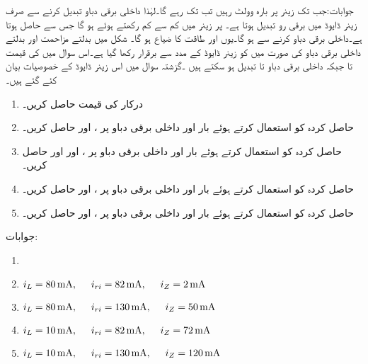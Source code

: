 %
جوابات:جب تک زینر پر بارہ وولٹ رہیں تب تک  رہے گا۔لہٰذا داخلی برقی دباو تبدیل کرنے سے صرف زینر ڈایوڈ میں برقی رو تبدیل ہوتا ہے۔ پر زینر میں کم سے کم  رکھتے ہوئے  ہو گا جس سے  حاصل ہوتا ہے۔داخلی برقی دباو  کرنے سے  ہو گا۔یوں  اور طاقت کا ضیاع  ہو گا۔
شکل   میں بدلتے مزاحمت  اور بدلتے داخلی برقی دباو کی صورت میں  کو زینر ڈایوڈ کے مدد سے برقرار رکھا گیا ہے۔اس سوال میں  کی قیمت  تا  جبکہ داخلی برقی دباو  تا  تبدیل ہو سکتے ہیں  ۔گزشتہ سوال میں اس زینر ڈایوڈ کے خصوصیات بیان کئے گئے ہیں۔
\begin{enumerate}
\item
درکار  کی قیمت حاصل کریں۔
\item
حاصل کردہ  کو استعمال کرتے ہوئے  بار اور  داخلی برقی دباو پر ،   اور  حاصل کریں۔
\item
حاصل کردہ  کو استعمال کرتے ہوئے  بار اور  داخلی برقی دباو پر ،   اور  اور حاصل کریں۔
\item
حاصل کردہ  کو استعمال کرتے ہوئے  بار اور  داخلی برقی دباو پر ،   اور   حاصل کریں۔
\item
حاصل کردہ  کو استعمال کرتے ہوئے  بار اور  داخلی برقی دباو پر ،  اور  حاصل کریں۔
\end{enumerate}
جوابات:
\begin{enumerate}
\item
{}
\item
$i_L=\SI{80}{\milli \ampere}, \hspace{5mm} i_{ri}=\SI{82}{\milli \ampere }, \hspace{5mm} i_Z=\SI{2}{\milli \ampere}$
\item
$i_L=\SI{80}{\milli \ampere}, \hspace{5mm} i_{ri}=\SI{130}{\milli \ampere }, \hspace{5mm} i_Z=\SI{50}{\milli \ampere}$
\item
$i_L=\SI{10}{\milli \ampere}, \hspace{5mm} i_{ri}=\SI{82}{\milli \ampere }, \hspace{5mm} i_Z=\SI{72}{\milli \ampere}$
\item
$i_L=\SI{10}{\milli \ampere}, \hspace{5mm} i_{ri}=\SI{130}{\milli \ampere }, \hspace{5mm} i_Z=\SI{120}{\milli \ampere}$

\end{enumerate} 
